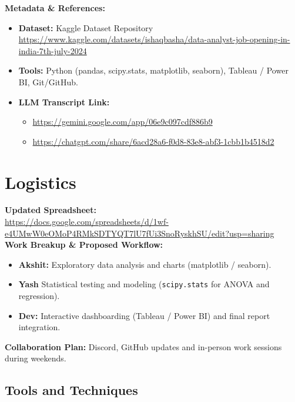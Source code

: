 \documentclass[11pt, a4paper]{article}
\begin{document}
\vspace{0.5em}
\textbf{Metadata \& References:}
\begin{itemize}
    \item \textbf{Dataset:} 
    Kaggle Dataset Repository \url{https://www.kaggle.com/datasets/ishaqbasha/data-analyst-job-opening-in-india-7th-july-2024}
    \item \textbf{Tools:} Python (pandas, scipy.stats, matplotlib, seaborn), Tableau / Power BI, Git/GitHub.
    \item \textbf{LLM Transcript Link:}
    \begin{itemize}
        \item \url{https://gemini.google.com/app/06e9c097cdf886b9}\\
        \item \url{https://chatgpt.com/share/6acd28a6-f0d8-83e8-abf3-1cbb1b4518d2}
    \end{itemize}

\end{itemize}

\section*{Logistics}

\textbf{Updated Spreadsheet:} \\
\url{https://docs.google.com/spreadsheets/d/1wf-e4UMwW0eOMoP4RMkSDTYQT7lU7fUi3SnoRyskhSU/edit?usp=sharing}\\

\vspace{0.5em}
\textbf{Work Breakup \& Proposed Workflow:}
\begin{itemize}
    \item \textbf{Akshit:} Exploratory data analysis and charts (matplotlib / seaborn).
    \item \textbf{Yash} Statistical testing and modeling (\texttt{scipy.stats} for ANOVA and regression).
    \item \textbf{Dev:} Interactive dashboarding (Tableau / Power BI) and final report integration.
\end{itemize}

\textbf{Collaboration Plan:} Discord, GitHub updates and in-person work sessions during weekends.

\subsection*{Tools and Techniques}
\end{document}

